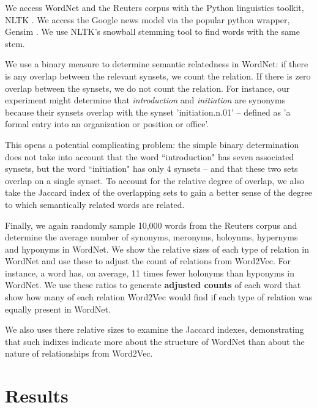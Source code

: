 \documentclass{article}
\begin{document}
We access WordNet and the Reuters corpus with the Python linguistics toolkit, NLTK \cite{BirdKleinLoper09}. We access the Google news model via the popular python wrapper, Gensim \cite{gensim}. We use NLTK's snowball stemming tool to find words with the same stem. 

We use a binary measure to determine semantic relatedness in WordNet: if there is any overlap between the relevant synsets, we count the relation. If there is zero overlap between the synsets, we do not count the relation. For instance, our experiment might determine that \textit{introduction} and \textit{initiation} are synonyms because their synsets overlap with the synset 'initiation.n.01' -- defined as 'a formal entry into an organization or position or office'. 

This opens a potential complicating problem: the simple binary determination does not take into account that the word ``introduction" has seven associated synsets, but the word ``initiation" has only 4 synsets -- and that these two sets overlap on a single synset. To account for the relative degree of overlap, we also take the Jaccard index of the overlapping sets to gain a better sense of the degree to which semantically related words are related.

Finally, we again randomly sample 10,000 words from the Reuters corpus and determine the average number of synonyms, meronyms, holoynms, hypernyms and hyponyms in WordNet. We show the relative sizes of each type of relation in WordNet and use these to adjust the count of relations from Word2Vec. For instance, a word has, on average, 11 times fewer holonyms than hyponyms in WordNet. We use these ratios to generate \textbf{adjusted counts} of each word that show how many of each relation Word2Vec would find if each type of relation was equally present in WordNet.

We also uses there relative sizes to examine the Jaccard indexes, demonstrating that such indixes indicate more about the structure of WordNet than about the nature of relationships from Word2Vec.

\section{Results}
\end{document}
